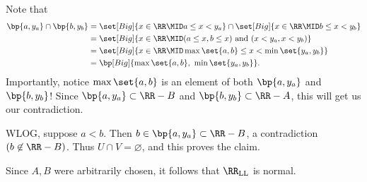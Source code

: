 \documentclass{fkpset}
\newcommand{\RRLL}{\ensuremath \RR_{\rm LL}}
\begin{document}
\begin{solution}
\begin{leftbar}
      Note that
      \begin{align*}
        \bp{a,y_a} \cap \bp{b, y_b}
        &= \set[Big]{x \in \RR \MID a \leq x < y_a} \cap \set[Big]{x \in \RR \MID b \leq x < y_b} \\
        &= \set[Big]{x \in \RR \MID (a \leq x, b \leq x) \text{ and } (x < y_a, x < y_b) } \\
        &= \set[Big]{x \in \RR \MID \max\set{a,b} \leq x < \min\set{y_a, y_b}} \\
        &= \bp[Big]{\max\set{a,b},\ \min\set{y_a, y_b}}.
      \end{align*}
      Importantly, notice $\max \set{a,b}$ is an element of both
      $\bp{a, y_a}$ and $\bp{b, y_b}$! Since $\bp{a, y_a} \subset \RR
      - B$ and $\bp{b, y_b} \subset \RR - A$, this will get us our
      contradiction.
    \end{leftbar}
    WLOG, suppose $a < b$. Then $b \in \bp{a, y_a} \subset \RR - B$, a
    contradiction {\color{red} $(b \not\in \RR - B)$}. Thus $U \cap V
    = \varnothing$, and this proves the claim. \cmark

    Since $A,B$ were arbitrarily chosen, it follows that $\RRLL$ is
    normal.
  \end{solution}
  \clearpage
\end{document}
